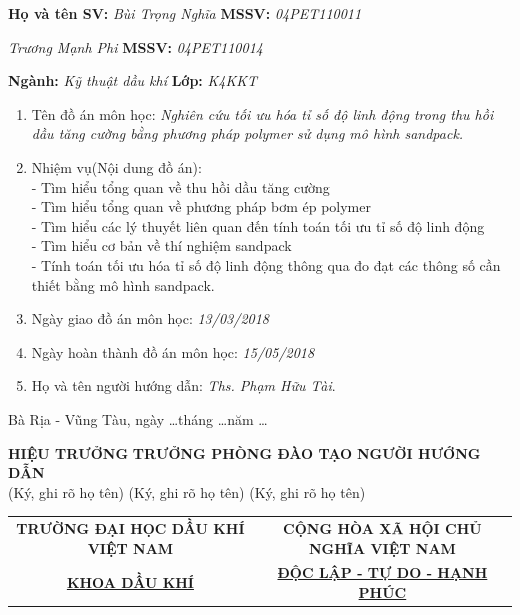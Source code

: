 \documentclass[12pt,a4paper]{article}
\begin{document}
\textbf{Họ và tên SV:} \textit{Bùi Trọng Nghĩa} \hspace{98pt} \textbf{MSSV:} \textit{04PET110011} 

\hspace{68pt} \textit{Trương Mạnh Phi} \hspace{95pt} \textbf{MSSV:} \textit{04PET110014}

\textbf{Ngành:} \textit{Kỹ thuật dầu khí} \hspace{130pt} \textbf{Lớp:} \textit{K4KKT}
\begin{enumerate}
	\item Tên đồ án môn học: \textit{Nghiên cứu tối ưu hóa tỉ số độ linh động trong thu hồi dầu tăng cường bằng phương pháp polymer sử dụng mô hình sandpack.}
	\item Nhiệm vụ(Nội dung đồ án):\\
	- Tìm hiểu tổng quan về thu hồi dầu tăng cường\\
	- Tìm hiểu tổng quan về phương pháp bơm ép polymer\\
	- Tìm hiểu các lý thuyết liên quan đến tính toán tối ưu tỉ số độ linh động\\
	- Tìm hiểu cơ bản về thí nghiệm sandpack\\
	- Tính toán tối ưu hóa tỉ số độ linh động thông qua đo đạt các thông số cần thiết bằng mô hình sandpack.
	\item Ngày giao đồ án môn học: \textit{13/03/2018}
	\item Ngày hoàn thành đồ án môn học: \textit{15/05/2018}
	\item Họ và tên người hướng dẫn: \textit{Ths. Phạm Hữu Tài}.	
\end{enumerate}
\begin{flushright}
Bà Rịa - Vũng Tàu, ngày \ldots tháng \ldots năm \ldots
\end{flushright}
\textbf{HIỆU TRƯỞNG} \hspace{30pt} \textbf{TRƯỞNG PHÒNG ĐÀO TẠO} \hspace{30pt} \textbf{NGƯỜI HƯỚNG DẪN}\\
(Ký, ghi rõ họ tên) \hspace{60pt} (Ký, ghi rõ họ tên) \hspace{80pt} (Ký, ghi rõ họ tên)
\newpage
\begin{table}[h]
\centering
\label{my-label}
\begin{tabular}{cc}
 \textbf{TRƯỜNG ĐẠI HỌC DẦU KHÍ VIỆT NAM} & \textbf{CỘNG HÒA XÃ HỘI CHỦ NGHĨA VIỆT NAM} \\
 \underline{\textbf{KHOA DẦU KHÍ}}& \underline{\textbf{ĐỘC LẬP - TỰ DO - HẠNH PHÚC}}
\end{tabular}
\end{table}
\end{document}
